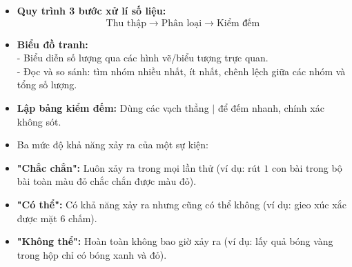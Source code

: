 \documentclass[10pt,a4paper]{article}
\begin{document}
\noindent
\begin{minipage}[t]{0.49\textwidth}\vspace{0pt}
\begin{tcolorbox}[
  enhanced,
  colback=violet!4!white,
  colframe=violet!75!black,
  arc=2mm, boxrule=0.8pt,
  left=2mm, right=2mm, top=1.8mm, bottom=1.8mm,
  title={\footnotesize\bfseries\color{white}\faKey\ 1. Trọng tâm Thống kê mô tả}
]
{\footnotesize
\begin{itemize}\setlength{\itemsep}{1pt}\setlength{\leftskip}{-2.5mm}
  \item \textbf{Quy trình 3 bước xử lí số liệu:}
  $$\text{Thu thập} \longrightarrow \text{Phân loại} \longrightarrow \text{Kiểm đếm}$$
  \item \textbf{Biểu đồ tranh:}\\
  - Biểu diễn số lượng qua các hình vẽ/biểu tượng trực quan.\\
  - Đọc và so sánh: tìm nhóm nhiều nhất, ít nhất, chênh lệch giữa các nhóm và tổng số lượng.
  \item \textbf{Lập bảng kiểm đếm:} Dùng các vạch thẳng $|$ để đếm nhanh, chính xác không sót.
\end{itemize}
}
\end{tcolorbox}
\end{minipage}
\hfill
\begin{minipage}[t]{0.49\textwidth}\vspace{0pt}
\begin{tcolorbox}[
  enhanced,
  colback=teal!4!white,
  colframe=teal!75!black,
  arc=2mm, boxrule=0.8pt,
  left=2mm, right=2mm, top=1.8mm, bottom=1.8mm,
  title={\footnotesize\bfseries\color{white}\faSliders\ 2. Trọng tâm Xác suất thực nghiệm}
]
{\footnotesize
\begin{itemize}\setlength{\itemsep}{1pt}\setlength{\leftskip}{-2.5mm}
  \item Ba mức độ khả năng xảy ra của một sự kiện:
  \item \textbf{"Chắc chắn":} Luôn xảy ra trong mọi lần thử (ví dụ: rút $1$ con bài trong bộ bài toàn màu đỏ chắc chắn được màu đỏ).
  \item \textbf{"Có thể":} Có khả năng xảy ra nhưng cũng có thể không (ví dụ: gieo xúc xắc được mặt 6 chấm).
  \item \textbf{"Không thể":} Hoàn toàn không bao giờ xảy ra (ví dụ: lấy quả bóng vàng trong hộp chỉ có bóng xanh và đỏ).
\end{itemize}
}
\end{tcolorbox}
\end{minipage}
\end{document}
